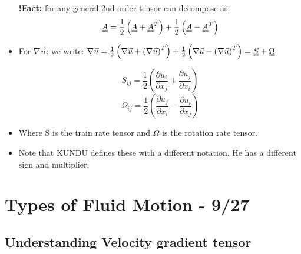 \documentclass[12pt]{report}
\begin{document}
\begin{itemize}
\item[\textbf{!Fact: }] for any general 2nd order tensor  can decompose as:
 \[\uuline{A} = \frac{1}{2}\left(\uuline{A}+\uuline{A}^T\right)+ \frac{1}{2}\left(\uuline{A}-\uuline{A}^T\right)\]
 
 \item For $\nabla\vec{u}$: we write: $\nabla\vec{u}=\frac{1}{2}\left(\nabla\vec{u}+\left(\nabla\vec{u}\right)^T\right)+\frac{1}{2}\left(\nabla\vec{u}-\left(\nabla\vec{u}\right)^T\right)=\uuline{S}+\uuline{\Omega}$

\[S_{ij} = \frac{1}{2}\left(\frac{\partial u_i}{\partial x_j}+\frac{\partial u_j}{\partial x_i}\right) \]
\[\Omega_{ij} = \frac{1}{2}\left(\frac{\partial u_j}{\partial x_i}-\frac{\partial u_i}{\partial x_j}\right) \]
\item Where S is the train rate tensor and $\Omega$ is the rotation rate tensor. 
\item Note that KUNDU defines these with a different notation. He has a different sign and multiplier.

\end{itemize}

\chapter{Types of Fluid Motion - 9/27}
\section{Understanding Velocity gradient tensor}
\end{document}

